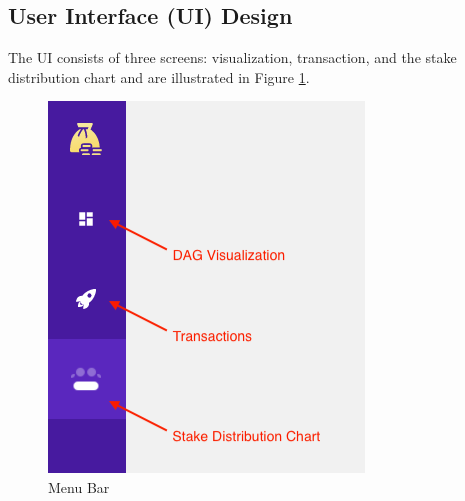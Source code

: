 \subsection{User Interface (UI) Design}
The UI consists of three screens: visualization, transaction, and the stake distribution chart and are illustrated in Figure \ref{fig:ramu_ui_menu_bar}.

\begin{figure}[htbp]
    \centering
    \includegraphics[width=0.3\linewidth]{figures/images/ramu/menubar.png}
	\caption{Menu Bar}
	\label{fig:ramu_ui_menu_bar}
\end{figure}

